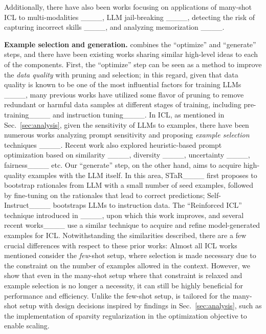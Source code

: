 Additionally, there have also been works focusing on {applications} of many-shot ICL to multi-modalities ____, LLM jail-breaking ____, detecting the risk of capturing incorrect skills ____, and analyzing memorization ____.


\textbf{Example selection and generation.}
\ours combines the ``optimize'' and ``generate'' steps, and there have been existing works sharing similar high-level ideas to each of the components. First, the ``optimize'' step can be seen as a method to improve the \textit{data quality} with pruning and selection; in this regard, given that data quality is known to be one of the most influential factors for training LLMs ____, many previous works have utilized some flavor of pruning to remove redundant or harmful data samples at different stages of training, including pre-training____ and instruction tuning____. In ICL, as mentioned in Sec.~\ref{sec:analysis}, given the sensitivity of LLMs to examples, there have been numerous works analyzing prompt sensitivity and proposing \textit{example selection} techniques ____. Recent work also explored heuristic-based prompt optimization based on similarity ____, diversity ____, uncertainty ____, fairness____ etc. Our ``generate'' step, on the other hand, aims to acquire high-quality examples with the LLM itself. In this area, STaR____ first proposes to bootstrap rationales from LLM with a small number of seed examples, followed by fine-tuning on the rationales that lead to correct predictions; Self-Instruct____ bootstraps LLMs to instruction data. The ``Reinforced ICL'' technique introduced in ____, upon which this work improves, and several recent works____ use a similar technique to acquire and refine model-generated examples for ICL. Notwithstanding the similarities described, there are a few crucial differences with respect to these prior works: Almost all ICL works mentioned consider the \textit{few}-shot setup, where selection is made necessary due to the constraint on the number of examples allowed in the context. However, we show that even in the many-shot setup where that constraint is relaxed and example selection is no longer a necessity, it can still be highly beneficial for performance and efficiency. Unlike the few-shot setup, \ours is tailored for the many-shot setup with design decisions inspired by findings in Sec.~\ref{sec:analysis}, such as the implementation of sparsity regularization in the optimization objective to enable scaling.